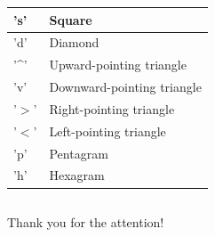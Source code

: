 \documentclass[xcolor={dvipsnames,rgb}, aspectratio=169]{beamer}
\begin{document}
\begin{frame}{}
\begin{columns}[t]
\begin{column}{0.5\textwidth}
\begin{table}
\begin{tabular}{l|l}
                    \hline
                    's'          & Square                     \\
                    \hline
                    'd'          & Diamond                    \\
                    \hline
                    '\^{}'       & Upward-pointing triangle   \\
                    \hline
                    'v'          & Downward-pointing triangle \\
                    \hline
                    '$>$'        & Right-pointing triangle    \\
                    \hline
                    '$<$'        & Left-pointing triangle     \\
                    \hline
                    'p'          & Pentagram                  \\
                    \hline
                    'h'          & Hexagram                   \\
                    \hline
                \end{tabular}
            \end{table}
        \end{column}
    \end{columns}
\end{frame}

{%
\begin{frame}[standout]
    Thank you for the attention!
\end{frame}
}
\end{document}

